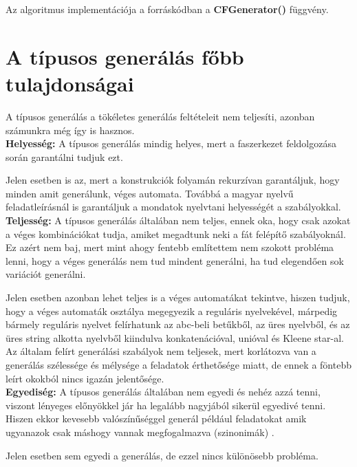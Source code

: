 \documentclass[12pt]{report}
\theoremstyle{definition}
\begin{document}
Az algoritmus implementációja a forráskódban a \textbf{CFGenerator()} függvény.

\pagebreak
\section{A típusos generálás főbb tulajdonságai}
A típusos generálás a tökéletes generálás feltételeit nem teljesíti, azonban számunkra még így is hasznos.\\

\textbf{Helyesség:} A típusos generálás mindig helyes, mert a faszerkezet feldolgozása során garantálni tudjuk ezt.

Jelen esetben is az, mert a konstrukciók folyamán rekurzívan garantáljuk, hogy minden amit generálunk, véges automata. Továbbá a magyar nyelvű feladatleírásnál is garantáljuk a mondatok nyelvtani helyességét a szabályokkal.\\

\textbf{Teljesség:} A típusos generálás általában nem teljes, ennek oka, hogy csak azokat a véges kombinációkat tudja, amiket megadtunk neki a fát felépítő szabályoknál. Ez azért nem baj, mert mint ahogy fentebb említettem nem szokott probléma lenni, hogy a véges generálás nem tud mindent generálni, ha tud elegendően sok variációt generálni.

Jelen esetben azonban lehet teljes is a véges automatákat tekintve, hiszen tudjuk, hogy a véges automaták osztálya megegyezik a reguláris nyelvekével, márpedig bármely reguláris nyelvet felírhatunk az abc-beli betűkből, az üres nyelvből, és az üres string alkotta nyelvből kiindulva konkatenációval, unióval és Kleene star-al. Az általam felírt generálási szabályok nem teljesek, mert korlátozva van a generálás szélessége és mélysége a feladatok érthetősége miatt, de ennek a föntebb leírt okokból nincs igazán jelentősége.\\

\textbf{Egyediség:} A típusos generálás általában nem egyedi és nehéz azzá tenni, viszont lényeges előnyökkel jár ha legalább nagyjából sikerül egyedivé tenni. Hiszen ekkor kevesebb valószínűséggel generál például feladatokat amik ugyanazok csak máshogy vannak megfogalmazva (szinonimák) .

Jelen esetben sem egyedi a generálás, de ezzel nincs különösebb probléma.
\end{document}

